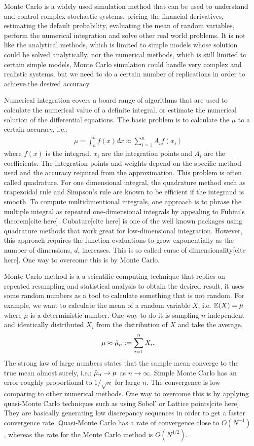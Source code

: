 \documentclass{iitthesis}
\begin{document}
Monte Carlo is a widely used simulation method that can be used to understand and control complex stochastic systems, pricing the financial derivatives, estimating the default probability, evaluating the mean of random variables, perform the numerical integration and solve other real world problems. It is not like the analytical methods, which is limited to simple models whose solution could be solved analytically, nor the numerical methods, which is still limited to certain simple models, Monte Carlo simulation could handle very complex and realistic systems, but we need to do a certain number of replications in order to achieve the desired accuracy.

Numerical integration covers a board range of algorithms that are used to calculate the numerical value of a definite integral, or estimate the numerical solution of the differential equations.
The basic problem is to calculate the $\mu$ to a certain accuracy, i.e.:
\begin{align}
\mu = \int_a^b f(x)dx \approx \sum_{i=1}^nA_i f(x_i)
\end{align}
where $f(x)$ is the integrad. $x_i$ are the integration points and $A_i$ are the coefficients. The integration points and weights depend on the specific method used and the accuracy required from the approximation.
This problem is often called quadrature. For one dimensional integral, the quadrature method such as trapezoidal rule and Simpson’s rule are known to be efficient if the integrand is smooth. To compute multidimentional integrals, one approach is to phrase the multiple integral as repeated one-dimensional integrals by appealing to Fubini's theorem[cite here]. Cubature[cite here] is one of the well known packages using quadrature methods that work great for low-dimensional integration. However, this approach requires the function evaluations to grow exponentially as the number of dimensions, $d$, increases. This is so called curse of dimensionality[cite here]. One way to overcome this is by Monte Carlo.

 Monte Carlo method is a a scientific computing technique that replies on repeated resampling and statistical analysis to obtain the desired result, it uses some random numbers as a tool to calculate something that is not random. For example, we want to calculate the mean of a random variable $X$, i.e. $\mathbb{E}(X) = \mu$ where $\mu$ is a deterministic number.  One way to do it is sampling $n$ independent and identically distributed $X_i$ from the distribution of $X$ and take the average,
$$\mu \approx \hat{\mu}_n := \sum_{i=1}^nX_i.$$
The strong law of large numbers states that the sample mean converge to the true mean almost surely, i.e.: $\hat{\mu}_n \to \mu$ as $n \to \infty$. Simple Monte Carlo has an error roughly proportional to $1/\sqrt{n}$ for large $n$. The convergence is low comparing to other numerical methods. One way to overcome this is by applying quasi-Monte Carlo techniques such as using Sobol' or Lattice points[cite here]. They are basically generating low discrepancy sequences in order to get a faster convergence rate. Quasi-Monte Carlo has a rate of convergence close to $O(N^{-1})$, whereas the rate for the Monte Carlo method is $O(N^{1/2})$.
\end{document}
